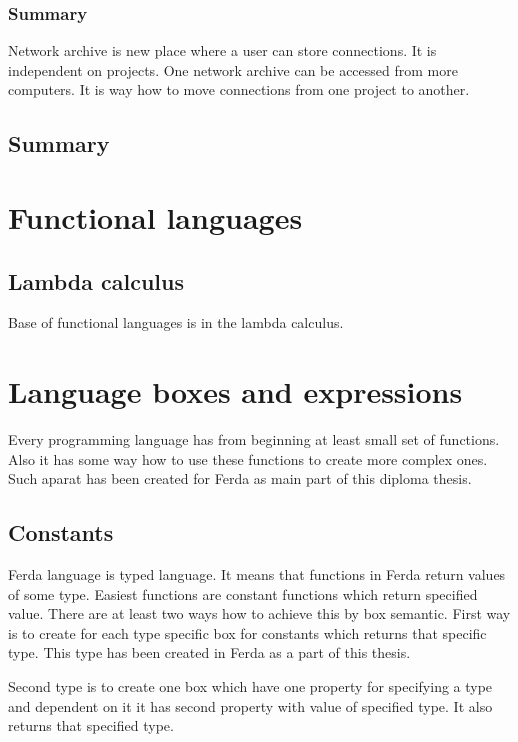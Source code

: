 \documentclass[a4paper,12pt]{book}
\begin{document}
\subsubsection{Summary}
Network archive is new place where a user can store connections. It is independent on projects. One network archive can be accessed from more computers. It is way how to move connections from one project to another.

\subsection{Summary}

\section{Functional languages}

\subsection{Lambda calculus}
Base of functional languages is in the lambda calculus. 


\section{Language boxes and expressions}
Every programming language has from beginning at least small set of functions. Also it has some way how to use these functions to create more complex ones. Such aparat has been created for Ferda as main part of this diploma thesis.

\subsection{Constants}
Ferda language is typed language. It means that functions in Ferda return values of some type. Easiest functions are constant functions which return specified value. There are at least two ways how to achieve this by box semantic. First way is to create for each type specific box for constants which returns that specific type. This type has been created in Ferda as a part of this thesis.

Second type is to create one box which have one property for specifying a type and dependent on it it has second property with value of specified type. It also returns that specified type.
\end{document}
